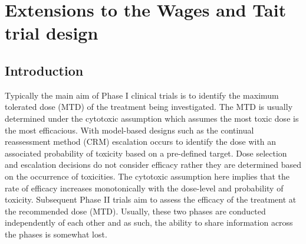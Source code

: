 
\chapter{Extensions to the Wages and Tait trial design} %

\label{WT} %


\section{Introduction}
\label{WT:Introduction}

Typically the main aim of Phase \RN{1} clinical trials is to identify the maximum tolerated dose (MTD) of the treatment being investigated. The MTD is usually determined under the cytotoxic assumption which assumes the most toxic dose is the most efficacious. With model-based designs such as the continual reassessment method (CRM) \cite{oquigleyContinualReassessmentMethod1990} escalation occurs to identify the dose with an associated probability of toxicity based on a pre-defined target. Dose selection and escalation decisions do not consider efficacy rather they are determined based on the occurrence of toxicities. The cytotoxic assumption here implies that the rate of efficacy increases monotonically with the dose-level and probability of toxicity. Subsequent Phase \RN{2} trials aim to assess the efficacy of the treatment at the recommended dose (MTD). Usually, these two phases are conducted independently of each other and as such, the ability to share information across the phases is somewhat lost. 

